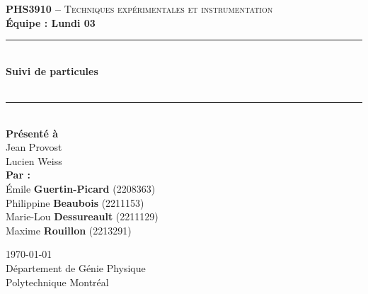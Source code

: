 \documentclass[11pt,letterpaper]{article}
\begin{document}
\begin{titlepage}
\center

\begin{figure}
\end{figure}
\vspace*{2 cm}

\textsc{\Large \textbf{PHS3910 --} Techniques expérimentales et instrumentation}\\[0.5cm]
\large{\textbf{Équipe : Lundi 03}}\\[1.5cm]

\rule{\linewidth}{0.5mm} \\[0.5cm]
\Large{\textbf{Suivi de particules}} \\[0.2cm]
\\
\rule{\linewidth}{0.5mm} \\[2.3cm]

\large{\textbf{Présenté à}\\
  Jean Provost\\
  Lucien Weiss\\[2.5cm]
  \textbf{Par :}\\
  Émile \textbf{Guertin-Picard} (2208363)\\
  Philippine \textbf{Beaubois} (2211153)\\
  Marie-Lou \textbf{Dessureault} (2211129)\\
  Maxime \textbf{Rouillon} (2213291)\\[3cm]}

\large{\today\\
Département de Génie Physique\\
Polytechnique Montréal\\}

\end{titlepage}


\tableofcontents
{}
\newpage

\pagestyle{fancy}
\setlength{\headheight}{14pt}
\renewcommand{\headrulewidth}{0pt}
\fancyfoot[R]{\thepage}

\pagestyle{fancy}
\fancyhf{}
\renewcommand{\headrulewidth}{1pt}
\fancyhead[R]{\today}
\fancyfoot[R]{\thepage}

\setcounter{page}{1}

\end{document}
